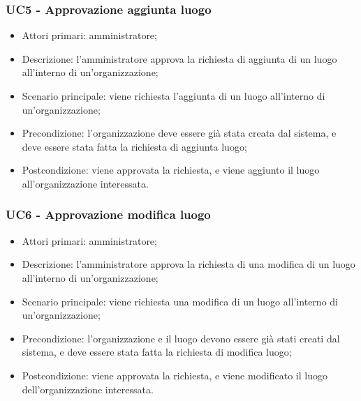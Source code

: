 \subsubsection{UC5 - Approvazione aggiunta luogo}

\begin{itemize}
\item Attori primari: amministratore;
\item Descrizione: l'amministratore approva la richiesta di aggiunta di un luogo all'interno di un'organizzazione;
\item Scenario principale: viene richiesta l'aggiunta di un luogo all'interno di un'organizzazione;
\item Precondizione: l'organizzazione deve essere già stata creata dal sistema, e deve essere stata fatta la richiesta di aggiunta luogo;
\item Postcondizione: viene approvata la richiesta, e viene aggiunto il luogo all'organizzazione interessata.

\end{itemize}

\subsubsection{UC6 - Approvazione modifica luogo}

\begin{itemize}
\item Attori primari: amministratore;
\item Descrizione: l'amministratore approva la richiesta di una modifica di un luogo all'interno di un'organizzazione;
\item Scenario principale: viene richiesta una modifica di un luogo all'interno di un'organizzazione;
\item Precondizione: l'organizzazione e il luogo devono essere già stati creati dal sistema, e deve essere stata fatta la richiesta di modifica luogo;
\item Postcondizione: viene approvata la richiesta, e viene modificato il luogo dell'organizzazione interessata.

\end{itemize}